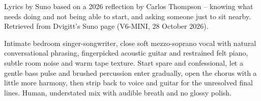 
\begin{notes}
Lyrics by Suno based on a 2026 reflection by Carlos Thompson -- knowing what needs doing and not being able to start, and asking someone just to sit nearby. Retrieved from Dvigitt's Suno page (V6-MINI, 28 October 2026).
\end{notes}
\begin{style}
Intimate bedroom singer-songwriter, close soft mezzo-soprano vocal with natural conversational phrasing, fingerpicked acoustic guitar and restrained felt piano, subtle room noise and warm tape texture. Start spare and confessional, let a gentle bass pulse and brushed percussion enter gradually, open the chorus with a little more harmony, then strip back to voice and guitar for the unresolved final lines. Human, understated mix with audible breath and no glossy polish.
\end{style}

